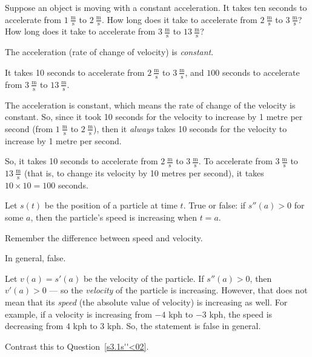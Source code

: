 \begin{Mquestion}\label{s3.1constaccel}
Suppose an object is moving with a constant acceleration. It takes ten seconds to accelerate from $1~\frac{\mathrm{m}}{\mathrm{s}}$ to $2~\frac{\mathrm{m}}{\mathrm{s}}$. How long does it take to accelerate from $2~\frac{\mathrm{m}}{\mathrm{s}}$   to $3~\frac{\mathrm{m}}{\mathrm{s}}$? How long does it take to accelerate from $3~\frac{\mathrm{m}}{\mathrm{s}}$ to $13~\frac{\mathrm{m}}{\mathrm{s}}$?
\end{Mquestion}
\begin{hint}
The acceleration (rate of change of velocity) is \emph{constant}.
\end{hint}
\begin{answer}
It takes 10 seconds to accelerate
from $2~\frac{\mathrm{m}}{\mathrm{s}}$   to $3~\frac{\mathrm{m}}{\mathrm{s}}$, and $100$ seconds to accelerate from $3~\frac{\mathrm{m}}{\mathrm{s}}$ to $13~\frac{\mathrm{m}}{\mathrm{s}}$.
\end{answer}
\begin{solution}
The acceleration is constant, which means the rate of change of the velocity is constant. So, since it took 10 seconds for the velocity to increase by 1 metre per second (from $1~\frac{\mathrm{m}}{\mathrm{s}}$ to $2~\frac{\mathrm{m}}{\mathrm{s}}$), then it \emph{always} takes 10 seconds for the velocity to increase by 1 metre per second.

So, it takes 10 seconds to accelerate
from $2~\frac{\mathrm{m}}{\mathrm{s}}$   to $3~\frac{\mathrm{m}}{\mathrm{s}}$. To accelerate from $3~\frac{\mathrm{m}}{\mathrm{s}}$ to $13~\frac{\mathrm{m}}{\mathrm{s}}$ (that is, to change its velocity by 10 metres per second), it takes $10\times 10=100$ seconds.
\end{solution}

\begin{Mquestion}\label{s3.1s''<0}
Let $s(t)$ be the position of a particle at time $t$. True or false: if $s''(a)>0$ for some $a$, then the particle's speed is increasing when $t=a$.
\end{Mquestion}
\begin{hint}
Remember the difference between speed and velocity.
\end{hint}
\begin{answer}
In general, false.
\end{answer}
\begin{solution}
Let $v(a) = s'(a)$ be the velocity of the particle. If  $s''(a)>0$, then $v'(a)>0$ --- so
the \emph{velocity} of the particle is increasing. However, that does not mean that its \emph{speed} (the absolute value
of velocity) is increasing as well. For example, if a velocity is increasing from $-4$ kph to $-3$ kph, the speed is
decreasing from $4$ kph to $3$ kph. So, the statement is false in general.

Contrast this to Question~\ref{s3.1s''<02}.
\end{solution}


